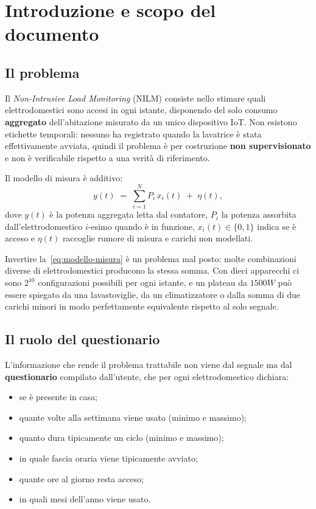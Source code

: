 \chapter{Introduzione e scopo del documento}

\section{Il problema}

Il \emph{Non-Intrusive Load Monitoring} (NILM) consiste nello stimare quali elettrodomestici
sono accesi in ogni istante, disponendo del solo consumo \textbf{aggregato} dell'abitazione
misurato da un unico dispositivo IoT. Non esistono etichette temporali: nessuno ha registrato
quando la lavatrice è stata effettivamente avviata, quindi il problema è per costruzione
\textbf{non supervisionato} e non è verificabile rispetto a una verità di riferimento.

Il modello di misura è additivo:
\begin{equation}
  y(t) \;=\; \sum_{i=1}^{N} P_i \, x_i(t) \;+\; \eta(t),
  \label{eq:modello-misura}
\end{equation}
dove $y(t)$ è la potenza aggregata letta dal contatore, $P_i$ la potenza assorbita
dall'elettrodomestico $i$-esimo quando è in funzione, $x_i(t) \in \{0,1\}$ indica se è acceso e
$\eta(t)$ raccoglie rumore di misura e carichi non modellati.

Invertire la~\eqref{eq:modello-misura} è un problema mal posto: molte combinazioni diverse di
elettrodomestici producono la stessa somma. Con dieci apparecchi ci sono $2^{10}$ configurazioni
possibili per ogni istante, e un plateau da $1500\unit{W}$ può essere spiegato da una
lavastoviglie, da un climatizzatore o dalla somma di due carichi minori in modo perfettamente
equivalente rispetto al solo segnale.

\section{Il ruolo del questionario}

L'informazione che rende il problema trattabile non viene dal segnale ma dal
\textbf{questionario} compilato dall'utente, che per ogni elettrodomestico dichiara:

\begin{itemize}[nosep,leftmargin=1.4em]
  \item se è presente in casa;
  \item quante volte alla settimana viene usato (minimo e massimo);
  \item quanto dura tipicamente un ciclo (minimo e massimo);
  \item in quale fascia oraria viene tipicamente avviato;
  \item quante ore al giorno resta acceso;
  \item in quali mesi dell'anno viene usato.
\end{itemize}

